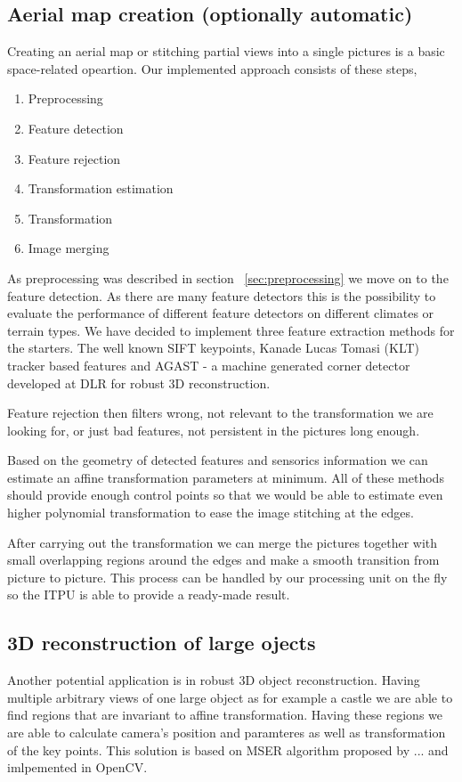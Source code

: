 \subsection{Aerial map creation (optionally automatic)}
Creating an aerial map or stitching partial views into a single pictures is a basic space-related opeartion. Our implemented
approach consists of these steps,
\begin{enumerate}
\item Preprocessing
\item Feature detection
\item Feature rejection
\item Transformation estimation
\item Transformation
\item Image merging
\end{enumerate}
As preprocessing was described in section ~\ref{sec:preprocessing} we move on to the feature detection. As there
are many feature detectors this is the possibility to evaluate the performance of different feature detectors on different
climates or terrain types. We have decided to implement three feature extraction methods for the starters. The well
known SIFT keypoints, Kanade Lucas Tomasi (KLT) tracker based features and AGAST - a machine generated corner detector
developed at DLR for robust 3D reconstruction. 

Feature rejection then filters wrong, not relevant to the transformation we are looking for, or just bad features, not 
persistent in the pictures long enough. 

Based on the geometry of detected features and sensorics information we can estimate an affine transformation parameters
at minimum. All of these methods should provide enough control points so that we would be able to estimate even higher 
polynomial transformation to ease the image stitching at the edges.

After carrying out the transformation we can merge the pictures together with small overlapping regions around the edges
and make a smooth transition from picture to picture. This process can be handled by our processing unit on the fly so the
ITPU is able to provide a ready-made result.

\subsection{3D reconstruction of large ojects}
Another potential application is in robust 3D object reconstruction. Having multiple arbitrary views of one large object as for example a castle
we are able to find regions that are invariant to affine transformation. Having these regions we are able to calculate camera's position
and paramteres as well as transformation of the key points. This solution is based on MSER algorithm proposed by ... and imlpemented 
in OpenCV.

